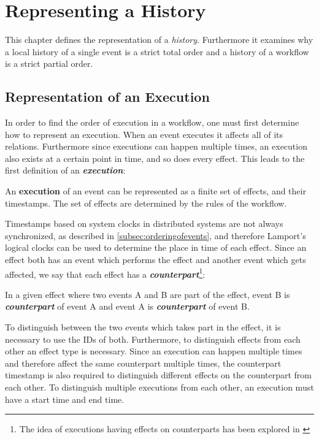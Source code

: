 \chapter{Representing a History}\label{chap:representing-a-history}
	This chapter defines the representation of a \textit{history}. Furthermore it examines why a local history of a single event is a strict total order and a history of a workflow is a strict partial order.
	
    \section{Representation of an Execution}\label{sec:rep:exec}
    In order to find the order of execution in a workflow, one must first determine how to represent an execution. When an event executes it affects all of its relations. Furthermore since executions can happen multiple times, an execution also exists at a certain point in time, and so does every effect. This leads to the first definition of an \textbf{\textit{execution}}:
	
	\begin{definition}
		An \textbf{execution} of an event can be represented as a finite set of effects, and their timestamps. The set of effects are determined by the rules of the workflow.
	\end{definition}
	
	\noindent Timestamps based on system clocks in distributed systems are not always synchronized, as described in \autoref{subsec:orderingofevents}, and therefore Lamport's logical clocks can be used to determine the place in time of each effect. Since an effect both has an event which performs the effect and another event which gets affected, we say that each effect has a \textbf{\textit{counterpart}}\footnote{The idea of executions having effects on counterparts has been explored in \cite{debois2015safety}}:
	
	\begin{definition}
		In a given effect where two events A and B are part of the effect, event B is \textbf{\textit{counterpart}} of event A and event A is \textbf{\textit{counterpart}} of event B.
	\end{definition}
	
	\noindent To distinguish between the two events which takes part in the effect, it is necessary to use the IDs of both. Furthermore, to distinguish effects from each other an effect type is necessary. Since an execution can happen multiple times and therefore affect the same counterpart multiple times, the counterpart timestamp is also required to distinguish different effects on the counterpart from each other. To distinguish multiple executions from each other, an execution must have a start time and end time.
	
